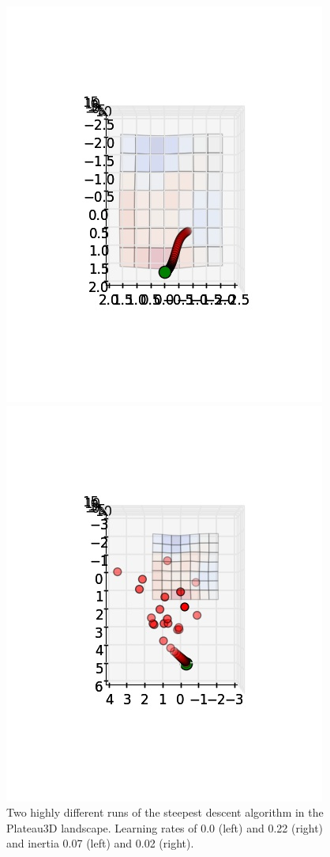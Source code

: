 \documentclass{scrartcl}
\begin{document}
\begin{figure}[H]
\centering
\begin{minipage}{.5\textwidth}
  \centering
  \includegraphics[width=.8\linewidth]{img/ex1/runs/SD-Plateau3D_0_0,07.jpg}
\end{minipage}%
\begin{minipage}{.5\textwidth}
  \centering
  \includegraphics[width=.8\linewidth]{img/ex1/runs/SD-Plateau3D_0,22_0,02.jpg}
\end{minipage}
\caption{Two highly different runs of the steepest descent algorithm in the Plateau3D landscape. Learning rates of 0.0 (left) and 0.22 (right) and inertia 0.07 (left) and 0.02 (right).}
\label{fig:}
\end{figure}
\end{document}
